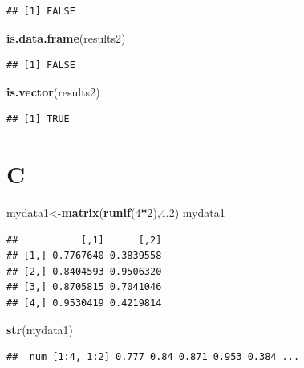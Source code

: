 \documentclass[]{book}
\newenvironment{Shaded}{\begin{snugshade}}{\end{snugshade}}
\newcommand{\KeywordTok}[1]{\textcolor[rgb]{0.13,0.29,0.53}{\textbf{#1}}}
\newcommand{\DecValTok}[1]{\textcolor[rgb]{0.00,0.00,0.81}{#1}}
\newcommand{\OperatorTok}[1]{\textcolor[rgb]{0.81,0.36,0.00}{\textbf{#1}}}
\newcommand{\NormalTok}[1]{#1}
\begin{document}
\begin{verbatim}
## [1] FALSE
\end{verbatim}

\begin{Shaded}
\begin{Highlighting}[]
\KeywordTok{is.data.frame}\NormalTok{(results2)}
\end{Highlighting}
\end{Shaded}

\begin{verbatim}
## [1] FALSE
\end{verbatim}

\begin{Shaded}
\begin{Highlighting}[]
\KeywordTok{is.vector}\NormalTok{(results2)}
\end{Highlighting}
\end{Shaded}

\begin{verbatim}
## [1] TRUE
\end{verbatim}

\section{C}\label{c}

\begin{Shaded}
\begin{Highlighting}[]
\NormalTok{mydata1<-}\KeywordTok{matrix}\NormalTok{(}\KeywordTok{runif}\NormalTok{(}\DecValTok{4}\OperatorTok{*}\DecValTok{2}\NormalTok{),}\DecValTok{4}\NormalTok{,}\DecValTok{2}\NormalTok{)}
\NormalTok{mydata1}
\end{Highlighting}
\end{Shaded}

\begin{verbatim}
##           [,1]      [,2]
## [1,] 0.7767640 0.3839558
## [2,] 0.8404593 0.9506320
## [3,] 0.8705815 0.7041046
## [4,] 0.9530419 0.4219814
\end{verbatim}

\begin{Shaded}
\begin{Highlighting}[]
\KeywordTok{str}\NormalTok{(mydata1)}
\end{Highlighting}
\end{Shaded}

\begin{verbatim}
##  num [1:4, 1:2] 0.777 0.84 0.871 0.953 0.384 ...
\end{verbatim}
\end{document}
